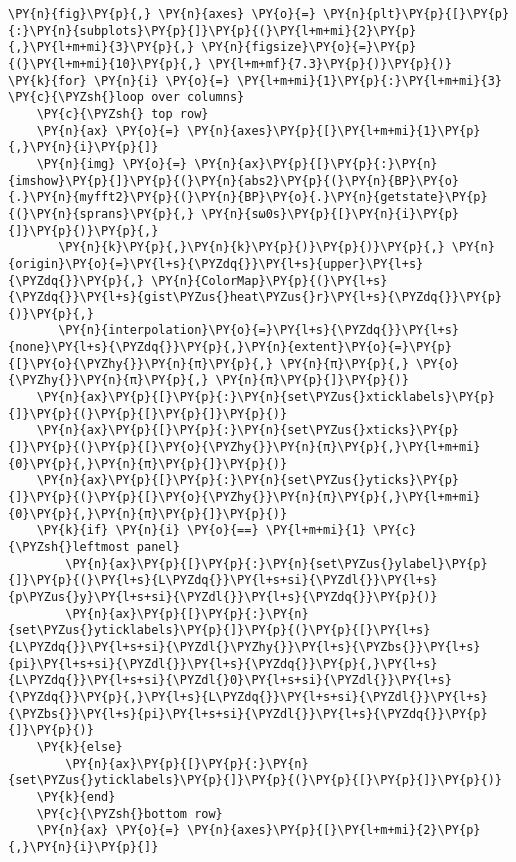 \begin{Verbatim}[commandchars=\\\{\}]
\PY{n}{fig}\PY{p}{,} \PY{n}{axes} \PY{o}{=} \PY{n}{plt}\PY{p}{[}\PY{p}{:}\PY{n}{subplots}\PY{p}{]}\PY{p}{(}\PY{l+m+mi}{2}\PY{p}{,}\PY{l+m+mi}{3}\PY{p}{,} \PY{n}{figsize}\PY{o}{=}\PY{p}{(}\PY{l+m+mi}{10}\PY{p}{,} \PY{l+m+mf}{7.3}\PY{p}{)}\PY{p}{)}
\PY{k}{for} \PY{n}{i} \PY{o}{=} \PY{l+m+mi}{1}\PY{p}{:}\PY{l+m+mi}{3} \PY{c}{\PYZsh{}loop over columns}
    \PY{c}{\PYZsh{} top row}
    \PY{n}{ax} \PY{o}{=} \PY{n}{axes}\PY{p}{[}\PY{l+m+mi}{1}\PY{p}{,}\PY{n}{i}\PY{p}{]}
    \PY{n}{img} \PY{o}{=} \PY{n}{ax}\PY{p}{[}\PY{p}{:}\PY{n}{imshow}\PY{p}{]}\PY{p}{(}\PY{n}{abs2}\PY{p}{(}\PY{n}{BP}\PY{o}{.}\PY{n}{myfft2}\PY{p}{(}\PY{n}{BP}\PY{o}{.}\PY{n}{getstate}\PY{p}{(}\PY{n}{sprans}\PY{p}{,} \PY{n}{sω0s}\PY{p}{[}\PY{n}{i}\PY{p}{]}\PY{p}{)}\PY{p}{,}
       \PY{n}{k}\PY{p}{,}\PY{n}{k}\PY{p}{)}\PY{p}{)}\PY{p}{,} \PY{n}{origin}\PY{o}{=}\PY{l+s}{\PYZdq{}}\PY{l+s}{upper}\PY{l+s}{\PYZdq{}}\PY{p}{,} \PY{n}{ColorMap}\PY{p}{(}\PY{l+s}{\PYZdq{}}\PY{l+s}{gist\PYZus{}heat\PYZus{}r}\PY{l+s}{\PYZdq{}}\PY{p}{)}\PY{p}{,}
       \PY{n}{interpolation}\PY{o}{=}\PY{l+s}{\PYZdq{}}\PY{l+s}{none}\PY{l+s}{\PYZdq{}}\PY{p}{,}\PY{n}{extent}\PY{o}{=}\PY{p}{[}\PY{o}{\PYZhy{}}\PY{n}{π}\PY{p}{,} \PY{n}{π}\PY{p}{,} \PY{o}{\PYZhy{}}\PY{n}{π}\PY{p}{,} \PY{n}{π}\PY{p}{]}\PY{p}{)}
    \PY{n}{ax}\PY{p}{[}\PY{p}{:}\PY{n}{set\PYZus{}xticklabels}\PY{p}{]}\PY{p}{(}\PY{p}{[}\PY{p}{]}\PY{p}{)}
    \PY{n}{ax}\PY{p}{[}\PY{p}{:}\PY{n}{set\PYZus{}xticks}\PY{p}{]}\PY{p}{(}\PY{p}{[}\PY{o}{\PYZhy{}}\PY{n}{π}\PY{p}{,}\PY{l+m+mi}{0}\PY{p}{,}\PY{n}{π}\PY{p}{]}\PY{p}{)}
    \PY{n}{ax}\PY{p}{[}\PY{p}{:}\PY{n}{set\PYZus{}yticks}\PY{p}{]}\PY{p}{(}\PY{p}{[}\PY{o}{\PYZhy{}}\PY{n}{π}\PY{p}{,}\PY{l+m+mi}{0}\PY{p}{,}\PY{n}{π}\PY{p}{]}\PY{p}{)}
    \PY{k}{if} \PY{n}{i} \PY{o}{==} \PY{l+m+mi}{1} \PY{c}{\PYZsh{}leftmost panel}
        \PY{n}{ax}\PY{p}{[}\PY{p}{:}\PY{n}{set\PYZus{}ylabel}\PY{p}{]}\PY{p}{(}\PY{l+s}{L\PYZdq{}}\PY{l+s+si}{\PYZdl{}}\PY{l+s}{p\PYZus{}y}\PY{l+s+si}{\PYZdl{}}\PY{l+s}{\PYZdq{}}\PY{p}{)}
        \PY{n}{ax}\PY{p}{[}\PY{p}{:}\PY{n}{set\PYZus{}yticklabels}\PY{p}{]}\PY{p}{(}\PY{p}{[}\PY{l+s}{L\PYZdq{}}\PY{l+s+si}{\PYZdl{}\PYZhy{}}\PY{l+s}{\PYZbs{}}\PY{l+s}{pi}\PY{l+s+si}{\PYZdl{}}\PY{l+s}{\PYZdq{}}\PY{p}{,}\PY{l+s}{L\PYZdq{}}\PY{l+s+si}{\PYZdl{}0}\PY{l+s+si}{\PYZdl{}}\PY{l+s}{\PYZdq{}}\PY{p}{,}\PY{l+s}{L\PYZdq{}}\PY{l+s+si}{\PYZdl{}}\PY{l+s}{\PYZbs{}}\PY{l+s}{pi}\PY{l+s+si}{\PYZdl{}}\PY{l+s}{\PYZdq{}}\PY{p}{]}\PY{p}{)}
    \PY{k}{else}
        \PY{n}{ax}\PY{p}{[}\PY{p}{:}\PY{n}{set\PYZus{}yticklabels}\PY{p}{]}\PY{p}{(}\PY{p}{[}\PY{p}{]}\PY{p}{)}
    \PY{k}{end}
    \PY{c}{\PYZsh{}bottom row}
    \PY{n}{ax} \PY{o}{=} \PY{n}{axes}\PY{p}{[}\PY{l+m+mi}{2}\PY{p}{,}\PY{n}{i}\PY{p}{]}

\end{Verbatim}
